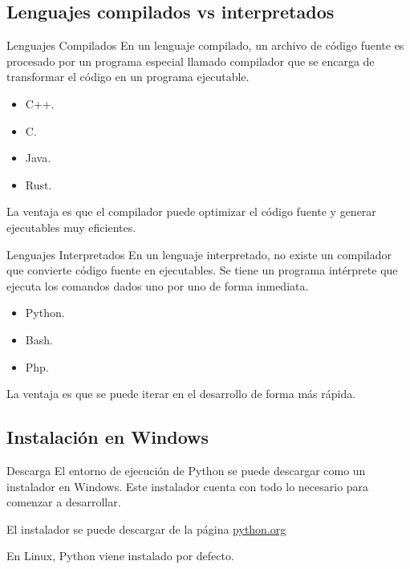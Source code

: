\documentclass[10pt]{beamer}
\begin{document}
\subsection{Lenguajes compilados vs interpretados}
\begin{frame}{Lenguajes Compilados}
    En un lenguaje compilado, un archivo de \alert{código fuente} 
    es procesado por un programa especial llamado \alert{compilador} que 
    se encarga de transformar el código en un programa \alert{ejecutable}.
    \begin{itemize}
        \item C++.
        \item C.
        \item Java.
        \item Rust.
    \end{itemize}
    La ventaja es que el compilador puede optimizar el código fuente y 
    generar ejecutables muy eficientes.
\end{frame}

\begin{frame}{Lenguajes Interpretados}
    En un lenguaje interpretado, no existe un compilador que convierte código fuente
    en ejecutables. Se tiene un programa \alert{intérprete} que ejecuta los comandos dados
    uno por uno de forma \alert{inmediata}.
    \begin{itemize}
        \item Python.
        \item Bash.
        \item Php.
    \end{itemize}
    La ventaja es que se puede iterar en el desarrollo de forma más rápida.
\end{frame}
\subsection{Instalación en Windows}
\begin{frame}{Descarga}
    El entorno de ejecución de Python se puede descargar como un \alert{instalador} en Windows. Este instalador 
    cuenta con todo lo necesario para comenzar a desarrollar.

    El instalador se puede descargar de la página \href{https://www.python.org/downloads/windows/}{python.org}

    En Linux, Python viene instalado \alert{por defecto}.

\end{frame}
\end{document}

